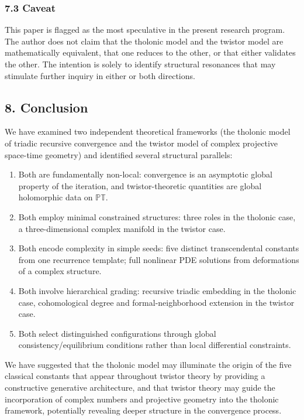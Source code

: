 \documentclass[
  11pt,
  letterpaper,
]{article}
\providecommand{\tightlist}{%
  \setlength{\itemsep}{0pt}\setlength{\parskip}{0pt}}
\begin{document}
\subsubsection{7.3 Caveat}\label{caveat}

This paper is flagged as the most speculative in the present research
program. The author does not claim that the tholonic model and the
twistor model are mathematically equivalent, that one reduces to the
other, or that either validates the other. The intention is solely to
identify structural resonances that may stimulate further inquiry in
either or both directions.

\subsection{8. Conclusion}\label{conclusion}

We have examined two independent theoretical frameworks (the tholonic
model of triadic recursive convergence and the twistor model of complex
projective space-time geometry) and identified several structural
parallels:

\begin{enumerate}
\def\labelenumi{\arabic{enumi}.}
\tightlist
\item
  Both are fundamentally non-local: convergence is an asymptotic global
  property of the iteration, and twistor-theoretic quantities are global
  holomorphic data on \(\mathbb{PT}\).
\item
  Both employ minimal constrained structures: three roles in the
  tholonic case, a three-dimensional complex manifold in the twistor
  case.
\item
  Both encode complexity in simple seeds: five distinct transcendental
  constants from one recurrence template; full nonlinear PDE solutions
  from deformations of a complex structure.
\item
  Both involve hierarchical grading: recursive triadic embedding in the
  tholonic case, cohomological degree and formal-neighborhood extension
  in the twistor case.
\item
  Both select distinguished configurations through global
  consistency/equilibrium conditions rather than local differential
  constraints.
\end{enumerate}

We have suggested that the tholonic model may illuminate the origin of
the five classical constants that appear throughout twistor theory by
providing a constructive generative architecture, and that twistor
theory may guide the incorporation of complex numbers and projective
geometry into the tholonic framework, potentially revealing deeper
structure in the convergence process.
\end{document}
